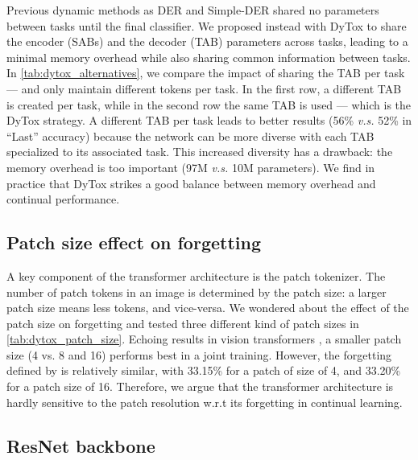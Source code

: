 Previous dynamic methods as DER \citep{yan2021der} and Simple-DER \citep{li2021preserve} shared no
parameters between tasks until the final classifier. We proposed instead with DyTox to share the
encoder (SABs) and the decoder (TAB) parameters across tasks, leading to a minimal memory overhead
while also sharing common information between tasks. In \autoref{tab:dytox_alternatives}, we compare
the impact of sharing the TAB per task --- and only maintain different tokens per task. In the first
row, a different TAB is created per task, while in the second row the same TAB is used --- which is
the DyTox strategy. A different TAB per task leads to better results (56\% \textit{v.s.} 52\% in
``Last'' accuracy) because the network can be more diverse with each TAB specialized to its
associated task. This increased diversity has a drawback: the memory overhead is too important (97M
\textit{v.s.} 10M parameters). We find in practice that DyTox strikes a good balance between memory
overhead and continual performance.





\subsection{Patch size effect on forgetting}

A key component of the transformer architecture is the patch tokenizer. The number of patch tokens
in an image is determined by the patch size: a larger patch size means less tokens, and vice-versa.
We wondered about the effect of the patch size on forgetting and tested three different kind of
patch sizes in \autoref{tab:dytox_patch_size}. Echoing results in vision transformers
\citep{dosovitskiy2020vit,touvron2021deit}, a smaller patch size (4 vs. 8 and 16) performs best in a
joint training. However, the forgetting defined by \citet{chaudhry2018riemannien_walk} is relatively
similar, with 33.15\% for a patch of size of 4, and 33.20\% for a patch size of 16. Therefore, we
argue that the transformer architecture is hardly sensitive to the patch resolution w.r.t its
forgetting in continual learning.



%   

\subsection{ResNet backbone}

